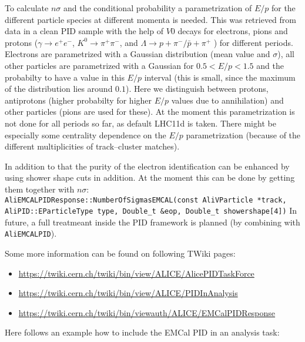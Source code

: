 To calculate $n\sigma$ and the conditional probability a parametrization of $E/p$ for the different particle species at different momenta is needed. This was retrieved from data in a clean PID sample with the help of $V0$ decays for electrons, pions and protons ($\gamma\rightarrow e^+e^-$, $K^0\rightarrow \pi^+\pi^-$, and $\Lambda\rightarrow p+\pi^-/\bar{p}+\pi^+$ ) for different periods. Electrons are parametrized with a Gaussian distribution (mean value and $\sigma$), all other particles are parametrized with a Gaussian for $0.5 < E/p < 1.5$ and the probabilty to have a value in this $E/p$ interval (this is small, since the maximum of the distribution lies around $0.1$). Here we distinguish between protons, antiprotons (higher probabilty for higher $E/p$ values due to annihilation) and other particles (pions are used for these). At the moment this parametrization is not done for all periods so far, as default LHC11d is taken. There might be especially some centrality dependence on the $E/p$ parametrization (because of the different multiplicities of track--cluster matches).

In addition to that the purity of the electron identification can be enhanced by using shower shape cuts in addition. At the moment this can be done by getting them together with $n\sigma$:\\
\texttt{AliEMCALPIDResponse::NumberOfSigmasEMCAL(const AliVParticle *track,\\ 
AliPID::EParticleType type, Double\_t \&eop, Double\_t showershape[4])} In future, a full treatmeant inside the PID framework is planned (by combining with \texttt{AliEMCALPID}).

Some more information can be found on following TWiki pages:
\begin{itemize}
\item \href{https://twiki.cern.ch/twiki/bin/view/ALICE/AlicePIDTaskForce}{https://twiki.cern.ch/twiki/bin/view/ALICE/AlicePIDTaskForce}
\item
\href{https://twiki.cern.ch/twiki/bin/view/ALICE/PIDInAnalysis}{https://twiki.cern.ch/twiki/bin/view/ALICE/PIDInAnalysis}
\item \href{https://twiki.cern.ch/twiki/bin/viewauth/ALICE/EMCalPIDResponse}{https://twiki.cern.ch/twiki/bin/viewauth/ALICE/EMCalPIDResponse}
\end{itemize}

Here follows an example how to include the EMCal PID in an analysis task:

